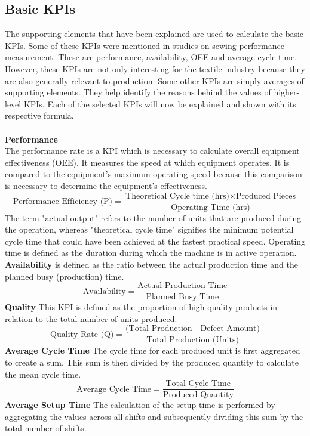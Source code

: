 {\subsection{Basic KPIs}
The supporting elements that have been explained are used to calculate the basic KPIs.
Some of these KPIs were mentioned in studies on sewing performance measurement. These are performance, availability, OEE and average cycle time. However, these KPIs are not only interesting for the textile industry because they are also generally relevant to production. Some other KPIs are simply averages of supporting elements. They help identify the reasons behind the values of higher-level KPIs. Each of the selected KPIs will now be explained and shown with its respective formula.\\
\\
\textbf{Performance}\\
The performance rate is a KPI which is necessary to calculate overall equipment effectiveness (OEE). It measures the speed at which equipment operates. It is compared to the equipment's maximum operating speed because this comparison is necessary to determine the equipment's effectiveness. \cite{muchiriPerformanceMeasurementUsing2008}
\[
\text{Performance Efficiency (P)} = \frac{\text{Theoretical Cycle time (hrs)} \times \text{Produced Pieces}}{\text{Operating Time (hrs)}}
\]
The term "actual output" refers to the number of units that are produced during the operation, whereas "theoretical cycle time" signifies the minimum potential cycle time that could have been achieved at the fastest practical speed. Operating time is defined as the duration during which the machine is in active operation.\\
\textbf{Availability}
is defined as the ratio between the actual production time and the planned busy (production) time.
\[
\text{Availability} = \frac{\text{Actual Production Time}}{\text{Planned Busy Time}}
\]
\textbf{Quality}
This KPI is defined as the proportion of high-quality products in relation to the total number of units produced.
\[
\text{Quality Rate (Q)} = \frac{\text{(Total Production - Defect Amount)}}{\text{Total Production (Units)}} 
\]
\textbf{Average Cycle Time}
The cycle time for each produced unit is first aggregated to create a sum. This sum is then divided by the produced quantity to calculate the mean cycle time.
\[
\text{Average Cycle Time} = \frac{\text{Total Cycle Time}}{\text{Produced Quantity}}
\]
\textbf{Average Setup Time}
The calculation of the setup time is performed by aggregating the values across all shifts and subsequently dividing this sum by the total number of shifts.
}
